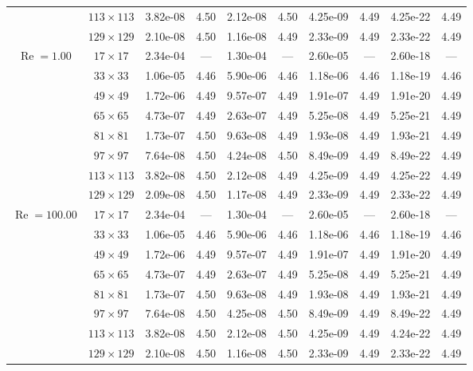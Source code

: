 \documentclass[preprint, 12pt]{elsarticle}
\begin{document}
\begin{center}
\begin{table}[H]
{\begin{tabular*}{\textwidth}{@{\extracolsep\fill}cccccccccc@{}}
    & $113\times 113$ & 3.82e-08 & 4.50 & 2.12e-08 & 4.50 & 4.25e-09 & 4.49 & 4.25e-22 & 4.49 \\
    & $129\times 129$ & 2.10e-08 & 4.50 & 1.16e-08 & 4.49 & 2.33e-09 & 4.49 & 2.33e-22 & 4.49 \\
    \hline\hline
    \multirow{7}{*}{$\operatorname{Re}=1.00$} & $17\times 17$ & 2.34e-04 & --- & 1.30e-04 & --- & 2.60e-05 & --- & 2.60e-18 & --- \\
    & $33\times 33$ & 1.06e-05 & 4.46 & 5.90e-06 & 4.46 & 1.18e-06 & 4.46 & 1.18e-19 & 4.46 \\
    & $49\times 49$ & 1.72e-06 & 4.49 & 9.57e-07 & 4.49 & 1.91e-07 & 4.49 & 1.91e-20 & 4.49 \\
    \multirow{3}{*}{$\operatorname{Wi}=10$} & $65\times 65$ & 4.73e-07 & 4.49 & 2.63e-07 & 4.49 & 5.25e-08 & 4.49 & 5.25e-21 & 4.49 \\
    & $81\times 81$ & 1.73e-07 & 4.50 & 9.63e-08 & 4.49 & 1.93e-08 & 4.49 & 1.93e-21 & 4.49 \\
    & $97\times 97$ & 7.64e-08 & 4.50 & 4.24e-08 & 4.50 & 8.49e-09 & 4.49 & 8.49e-22 & 4.49 \\
    & $113\times 113$ & 3.82e-08 & 4.50 & 2.12e-08 & 4.49 & 4.25e-09 & 4.49 & 4.25e-22 & 4.49 \\
    & $129\times 129$ & 2.09e-08 & 4.50 & 1.17e-08 & 4.49 & 2.33e-09 & 4.49 & 2.33e-22 & 4.49 \\
    \hline
    \multirow{7}{*}{$\operatorname{Re}=100.00$} & $17\times 17$ & 2.34e-04 & --- & 1.30e-04 & --- & 2.60e-05 & --- & 2.60e-18 & --- \\
    & $33\times 33$ & 1.06e-05 & 4.46 & 5.90e-06 & 4.46 & 1.18e-06 & 4.46 & 1.18e-19 & 4.46 \\
    & $49\times 49$ & 1.72e-06 & 4.49 & 9.57e-07 & 4.49 & 1.91e-07 & 4.49 & 1.91e-20 & 4.49 \\
    \multirow{3}{*}{$\operatorname{Wi}=10$} & $65\times 65$ & 4.73e-07 & 4.49 & 2.63e-07 & 4.49 & 5.25e-08 & 4.49 & 5.25e-21 & 4.49 \\
    & $81\times 81$ & 1.73e-07 & 4.50 & 9.63e-08 & 4.49 & 1.93e-08 & 4.49 & 1.93e-21 & 4.49 \\
    & $97\times 97$ & 7.64e-08 & 4.50 & 4.25e-08 & 4.50 & 8.49e-09 & 4.49 & 8.49e-22 & 4.49 \\
    & $113\times 113$ & 3.82e-08 & 4.50 & 2.12e-08 & 4.50 & 4.25e-09 & 4.49 & 4.24e-22 & 4.49 \\
    & $129\times 129$ & 2.10e-08 & 4.50 & 1.16e-08 & 4.50 & 2.33e-09 & 4.49 & 2.33e-22 & 4.49 \\

\end{tabular*}}
\end{table}
\end{center}
\end{document}
